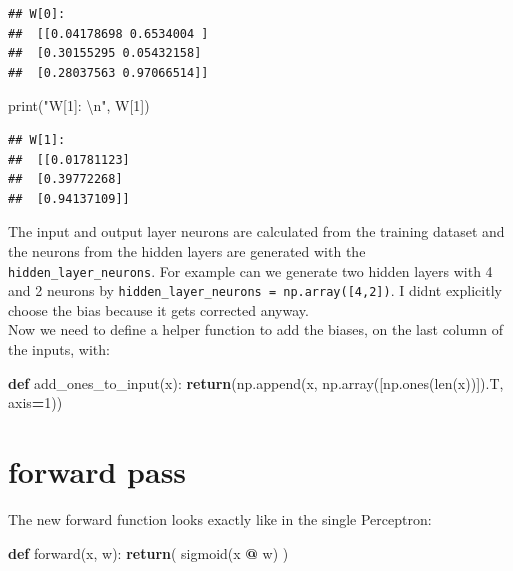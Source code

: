 \documentclass[
]{book}
\newenvironment{Shaded}{\begin{snugshade}}{\end{snugshade}}
\newcommand{\BuiltInTok}[1]{#1}
\newcommand{\CharTok}[1]{\textcolor[rgb]{0.31,0.60,0.02}{#1}}
\newcommand{\ControlFlowTok}[1]{\textcolor[rgb]{0.13,0.29,0.53}{\textbf{#1}}}
\newcommand{\DecValTok}[1]{\textcolor[rgb]{0.00,0.00,0.81}{#1}}
\newcommand{\KeywordTok}[1]{\textcolor[rgb]{0.13,0.29,0.53}{\textbf{#1}}}
\newcommand{\NormalTok}[1]{#1}
\newcommand{\OperatorTok}[1]{\textcolor[rgb]{0.81,0.36,0.00}{\textbf{#1}}}
\newcommand{\StringTok}[1]{\textcolor[rgb]{0.31,0.60,0.02}{#1}}
\begin{document}
\begin{verbatim}
## W[0]: 
##  [[0.04178698 0.6534004 ]
##  [0.30155295 0.05432158]
##  [0.28037563 0.97066514]]
\end{verbatim}

\begin{Shaded}
\begin{Highlighting}[]
\BuiltInTok{print}\NormalTok{(}\StringTok{"W[1]: }\CharTok{\textbackslash{}n}\StringTok{"}\NormalTok{, W[}\DecValTok{1}\NormalTok{])}
\end{Highlighting}
\end{Shaded}

\begin{verbatim}
## W[1]: 
##  [[0.01781123]
##  [0.39772268]
##  [0.94137109]]
\end{verbatim}

The input and output layer neurons are calculated from the training dataset and the neurons from the hidden layers are generated with the \texttt{hidden\_layer\_neurons}. For example can we generate two hidden layers with 4 and 2 neurons by \texttt{hidden\_layer\_neurons\ =\ np.array({[}4,2{]})}. I didnt explicitly choose the bias because it gets corrected anyway.\\
Now we need to define a helper function to add the biases, on the last column of the inputs, with:

\begin{Shaded}
\begin{Highlighting}[]
\KeywordTok{def}\NormalTok{ add\_ones\_to\_input(x):}
  \ControlFlowTok{return}\NormalTok{(np.append(x, np.array([np.ones(}\BuiltInTok{len}\NormalTok{(x))]).T, axis}\OperatorTok{=}\DecValTok{1}\NormalTok{))}
\end{Highlighting}
\end{Shaded}

\hypertarget{forward-pass-1}{%
\section{forward pass}\label{forward-pass-1}}

The new forward function looks exactly like in the single Perceptron:

\begin{Shaded}
\begin{Highlighting}[]
\KeywordTok{def}\NormalTok{ forward(x, w):}
  \ControlFlowTok{return}\NormalTok{( sigmoid(x }\OperatorTok{@}\NormalTok{ w) )}
\end{Highlighting}
\end{Shaded}
\end{document}

